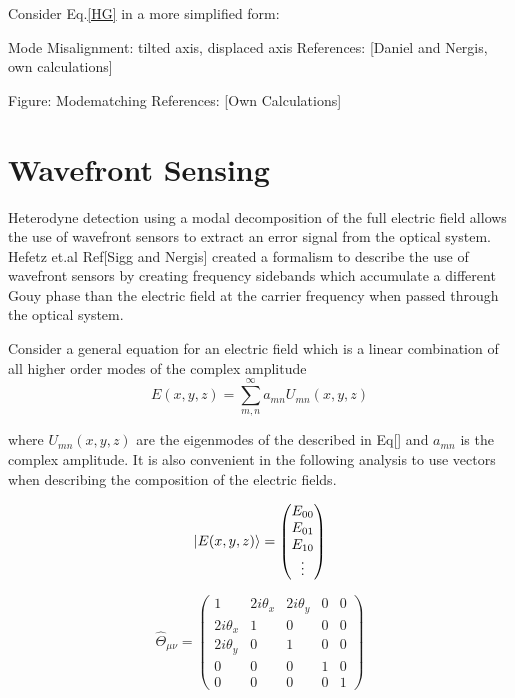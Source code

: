 \documentclass[oneside]{book}
\begin{document}
		Consider Eq.\ref{HG} in a more simplified form:
		
		
		
		
		Mode Misalignment: tilted axis, displaced axis
		References: [Daniel and Nergis, own calculations]
			
		
		
		Figure: Modematching
			References: [Own Calculations]
				
		
		\section{Wavefront Sensing}
		Heterodyne detection using a modal decomposition of the full electric field allows the use of wavefront sensors to extract an error signal from the optical system.  Hefetz et.al Ref[Sigg and Nergis] created a formalism to describe the use of wavefront sensors by creating frequency sidebands which accumulate a different Gouy phase than the electric field at the carrier frequency when passed through the optical system.  
		
		Consider a general equation for an electric field which is a linear combination of all higher order modes of the complex amplitude
		\begin{equation}
		E(x,y,z) = \sum\limits_{m,n}^{\infty} a_{mn} U_{mn}(x,y,z)
		\end{equation}
		
		where $ U_{mn}(x,y,z)$ are the eigenmodes of the described in Eq[] and $a_{mn}$ is the complex amplitude.  It is also convenient in the following analysis to use vectors when describing the composition of the electric fields.
		
		\begin{equation}
		\ket{E(x,y,z)} = \begin{pmatrix} E_{00} \\ E_{01} \\ E_{10} \\ \vdots \end{pmatrix}
		\end{equation}

		\begin{equation} \label{misalign_matrix}
		\hat{\Theta}_{\mu \nu} = 
		\begin{pmatrix}
		   1			&2i\theta_x		&2i\theta_y		& 0 & 0
		\\ 2i\theta_x	&1				&0				& 0	& 0
		\\ 2i\theta_y	&0				&1				& 0	& 0
		\\ 0			&0				&0				& 1	& 0
		\\ 0			&0				&0				& 0	& 1
		\end{pmatrix}
		\end{equation}
\end{document}
